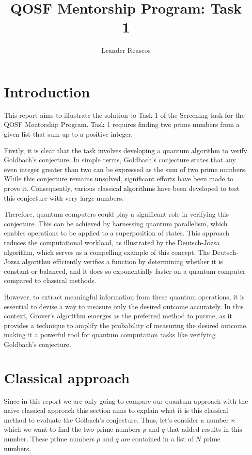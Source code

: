 \documentclass[12pt, a4paper]{article}
\title{QOSF Mentorship Program: Task 1}
\author{Leander Reascos}
\begin{document}
    \maketitle

    \section{Introduction}

    This report aims to illustrate the solution to Task 1 of the Screening task for the QOSF Mentorship Program. Task 1 requires finding two prime numbers from a given list that sum up to a positive integer.

    Firstly, it is clear that the task involves developing a quantum algorithm to verify Goldbach's conjecture. In simple terms, Goldbach's conjecture states that any even integer greater than two can be expressed as the sum of two prime numbers. While this conjecture remains unsolved, significant efforts have been made to prove it. Consequently, various classical algorithms have been developed to test this conjecture with very large numbers.

    Therefore, quantum computers could play a significant role in verifying this conjecture. This can be achieved by harnessing quantum parallelism, which enables operations to be applied to a superposition of states. This approach reduces the computational workload, as illustrated by the Deutsch-Jozsa algorithm, which serves as a compelling example of this concept. The Deutsch-Jozsa algorithm efficiently verifies a function by determining whether it is constant or balanced, and it does so exponentially faster on a quantum computer compared to classical methods.

    However, to extract meaningful information from these quantum operations, it is essential to devise a way to measure only the desired outcome accurately. In this context, Grover's algorithm \cite{grover1996fast} emerges as the preferred method to pursue, as it provides a technique to amplify the probability of measuring the desired outcome, making it a powerful tool for quantum computation tasks like verifying Goldbach's conjecture.


    \section{Classical approach}

    Since in this report we are only going to compare our quantum approach with the naive classical approach this section aims to explain what it is this classical method to evaluate the Golbach's conjecture. Thus, let's consider a number $n$ which we want to find the two prime numbers  $p$ and $q$ that added results in this number. These prime numbers $p$ and $q$ are contained in a list of $N$ prime numbers.
\end{document}
